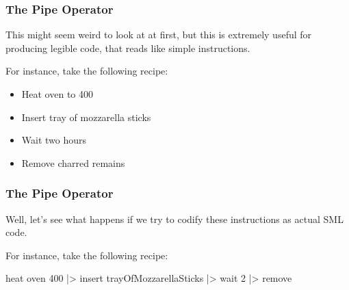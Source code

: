 \documentclass[aspectratio=169]{beamer}
\begin{document}
\begin{frame}[fragile]
  \frametitle{The Pipe Operator}

  This might seem weird to look at at first, but this is extremely useful for
  producing legible code, that reads like simple instructions.

  \pause
  \vspace{\fill}

  For instance, take the following recipe:
  \begin{itemize}
    \item Heat oven to 400
    \item Insert tray of mozzarella sticks
    \item Wait two hours
    \item Remove charred remains
  \end{itemize}
\end{frame}

\begin{frame}[fragile]
  \frametitle{The Pipe Operator}

  Well, let's see what happens if we try to codify these instructions as
  actual SML code.

  \pause
  \vspace{\fill}

  For instance, take the following recipe:
  \begin{codeblock}
    heat oven 400
    |> insert trayOfMozzarellaSticks
    |> wait 2
    |> remove
  \end{codeblock}
\end{frame}
\end{document}

